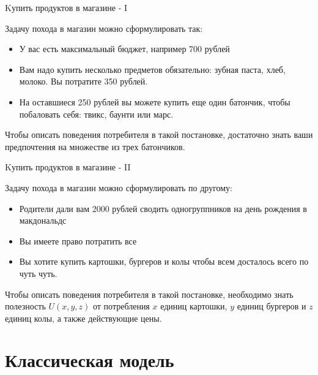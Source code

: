 \documentclass{beamer}
\begin{document}
\begin{frame}{Kупить продуктов в магазине - I}
	
Задачу похода в магазин можно сформулировать так:

\begin{itemize}
  \item У вас есть максимальный бюджет, например 700 рублей
  \item Вам надо купить несколько предметов обязательно: зубная паста, хлеб, молоко. Вы потратите 350 рублей.
  \item На оставшиеся 250 рублей вы можете купить еще один батончик, чтобы побаловать себя: твикс, баунти или марс.
\end{itemize}

Чтобы описать поведения потребителя в такой постановке, достаточно знать ваши предпочтения на множестве из трех батончиков.
	
\end{frame}

\begin{frame}{Kупить продуктов в магазине - II}
	
Задачу похода в магазин можно сформулировать по другому:

\begin{itemize}
  \item Родители дали вам 2000 рублей сводить одногруппников на день рождения в макдональдс
  \item Вы имеете право потратить все
  \item Вы хотите купить картошки, бургеров и колы чтобы всем досталось всего по чуть чуть.
\end{itemize}

Чтобы описать поведения потребителя в такой постановке, необходимо знать полезность $U(x,y,z)$ от потребления $x$ единиц картошки, $y$ единиц бургеров и $z$ единиц колы, а также действующие цены.
	
\end{frame}

\section{Классическая модель}
\end{document}

